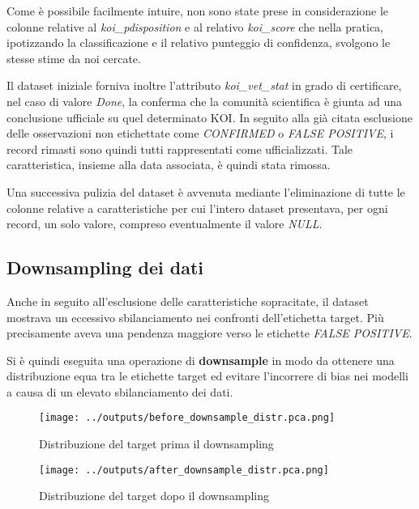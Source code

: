 Come è possibile facilmente intuire, non sono state prese in considerazione 
le colonne relative al \textit{koi\_pdisposition} e al relativo \textit{koi\_score} 
che nella pratica, ipotizzando la classificazione e il relativo punteggio di confidenza, 
svolgono le stesse stime da noi cercate.

Il dataset iniziale forniva inoltre l'attributo \textit{koi\_vet\_stat} in grado di 
certificare, nel caso di valore \textit{Done}, la conferma che la comunità scientifica è 
giunta ad una conclusione ufficiale su quel determinato KOI.
In seguito alla già citata esclusione delle osservazioni non etichettate come \textit{CONFIRMED} 
o \textit{FALSE POSITIVE}, i record rimasti sono quindi tutti rappresentati come ufficializzati.
Tale caratteristica, insieme alla data associata, è quindi stata rimossa.

Una successiva pulizia del dataset è avvenuta mediante l'eliminazione di tutte le colonne 
relative a caratteristiche per cui l'intero dataset presentava, per ogni record, 
un solo valore, compreso eventualmente il valore \textit{NULL}.\\

\subsection{Downsampling dei dati}
Anche in seguito all'esclusione delle caratteristiche sopracitate, il dataset mostrava un 
eccessivo sbilanciamento nei confronti dell'etichetta target. Più precisamente 
aveva una pendenza maggiore verso le etichette \textit{FALSE POSITIVE}.

Si è quindi eseguita una operazione di \textbf{downsample} in modo da ottenere una 
distribuzione equa tra le etichette target ed evitare l'incorrere di bias nei modelli 
a causa di un elevato sbilanciamento dei dati.

\begin{figure}[!htb]
    \begin{minipage}{0.48\textwidth}
      \centering
      \texttt{[image: ../outputs/before\_downsample\_distr.pca.png]}
      \caption{Distribuzione del target prima il downsampling}
      \label{Fig:Data1}
    \end{minipage}\hfill
    \begin{minipage}{0.48\textwidth}
      \centering
      \texttt{[image: ../outputs/after\_downsample\_distr.pca.png]}
      \caption{Distribuzione del target dopo il downsampling}
      \label{Fig:Data2}
    \end{minipage}
\end{figure}


